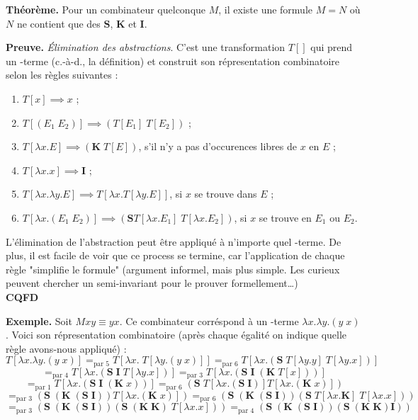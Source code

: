 \textbf{Théorème.} Pour un combinateur quelconque $M$, il existe une formule $M = N$ où $N$ ne contient que des $\mathbf{S}$, $\mathbf{K}$ et $\mathbf{I}$.

\textbf{Preuve.}
\emph{Élimination des abstractions}. C'est une transformation $T[]$ qui prend un \lam -terme (c.-à-d., la définition) et construit son répresentation combinatoire selon les règles suivantes :
\begin{enumerate}
	\item $T[x] \implies x$ ;
	\item $T[(E_1 \; E_2)] \implies (T[E_1] \; T[E_2])$ ;
	\item $T[\lambda x. E] \implies (\mathbf{K} \; T[E])$, s'il n'y a pas d'occurences libres de $x$ en $E$ ;
	\item $T[\lambda x. x] \implies \mathbf{I}$ ;
	\item $T[\lambda x. \lambda y. E] \implies T[\lambda x. T[\lambda y. E]]$, si $x$ se trouve dans $E$ ;
	\item $T[\lambda x. (E_1 \; E_2)] \implies (\mathbf{S} T[\lambda x. E_1] \; T[\lambda x. E_2])$, si $x$ se trouve en $E_1$ ou $E_2$.
\end{enumerate}
L'élimination de l'abstraction peut être appliqué à n'importe quel \lam -terme. De plus, il est facile de voir que ce process se termine, car l'application de chaque règle "simplifie le formule" (argument informel, mais plus simple. Les curieux peuvent chercher un semi-invariant pour le prouver formellement\ldots)
\\
\textbf{CQFD}

\textbf{Exemple.} Soit $M x y \equiv y x$. Ce combinateur corréspond à un \lam -terme $\lambda x. \lambda y. (y \; x)$. Voici son répresentation combinatoire (après chaque égalité on indique quelle règle avons-nous appliqué) :
\[
T[\lambda x. \lambda y. (y \; x)] =_\text{par 5} T[\lambda x. \; T[\lambda y. (y \; x)]] =_\text{par 6} T[\lambda x. (\mathbf{S} \; T[\lambda y. y] \; T[\lambda y. x])]
\]
\[
=_\text{par 4} T[\lambda x. (\mathbf{S} \; \mathbf{I} \; T[\lambda y. x])] =_\text{par 3} T[\lambda x. (\mathbf{S} \; \mathbf{I} \; (\mathbf{K} \; T[x]))]
\]
\[
=_\text{par 1} T[\lambda x. (\mathbf{S} \; \mathbf{I} \; (\mathbf{K} \; x))] =_\text{par 6} (\mathbf{S} \; T[\lambda x. (\mathbf{S} \; \mathbf{I})] T[\lambda x. (\mathbf{K} \; x)])
\]
\[
=_\text{par 3} (\mathbf{S} \; (\mathbf{K} \; (\mathbf{S} \; \mathbf{I})) T[\lambda x. (\mathbf{K} \; x)])
=_\text{par 6} (\mathbf{S} \; (\mathbf{K} \; (\mathbf{S} \; \mathbf{I})) (\mathbf{S} \; T[\lambda x. \mathbf{K}] \; T[\lambda x. x]))
\]
\[
=_\text{par 3} (\mathbf{S} \; (\mathbf{K} \; (\mathbf{S} \; \mathbf{I})) (\mathbf{S} \; (\mathbf{K \; K}) \; T[\lambda x. x]))
=_\text{par 4} (\mathbf{S} \; (\mathbf{K} \; (\mathbf{S} \; \mathbf{I})) (\mathbf{S} \; (\mathbf{K \; K}) \mathbf{I}))
\]

